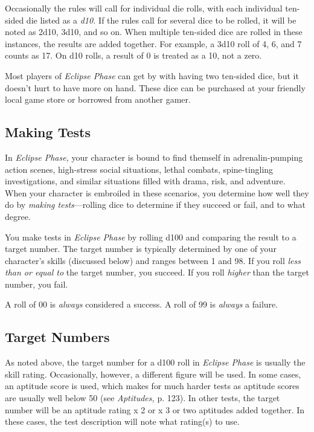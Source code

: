 Occasionally the rules will call for individual die 
rolls, with each individual ten-sided die listed as a \textit{d10. }
If the rules call for several dice to be rolled, it will be 
noted as 2d10, 3d10, and so on. When multiple ten-sided
dice are rolled in these instances, the results are
added together. For example, a 3d10 roll of 4, 6, and 
7 counts as 17. On d10 rolls, a result of 0 is treated as 
a 10, not a zero.

Most players of \textit{Eclipse Phase} can get by with 
having two ten-sided dice, but it doesn't hurt to 
have more on hand. These dice can be purchased 
at your friendly local game store or borrowed from 
another gamer.

\subsection{Making Tests}

In  \textit{Eclipse Phase,} your character is bound to find 
themself in adrenalin-pumping action scenes, high-stress
social situations, lethal combats, spine-tingling
investigations, and similar situations filled with drama, 
risk, and adventure. When your character is embroiled 
in these scenarios, you determine how well they do by 
\textit{making tests}—rolling dice to determine if they succeed 
or fail, and to what degree.

You make tests in \textit{Eclipse Phase} by rolling d100 and 
comparing the result to a target number. The target 
number is typically determined by one of your character's
skills (discussed below) and ranges between 1
and 98. If you roll \textit{less than or equal to} the target 
number, you succeed. If you roll \textit{higher} than the target 
number, you fail.

A roll of 00 is \textit{always} considered a success. A roll of 
99 is \textit{always }a failure.

\subsection{Target Numbers}

As noted above, the target number for a d100 roll in 
\textit{Eclipse Phase} is usually the skill rating. Occasionally, 
however, a different figure will be used. In some cases, 
an aptitude score is used, which makes for much 
harder tests as aptitude scores are usually well below 
50 (see \textit{Aptitudes,} p. 123). In other tests, the target 
number will be an aptitude rating x 2 or x 3 or two 
aptitudes added together. In these cases, the test description
will note what rating(s) to use.

